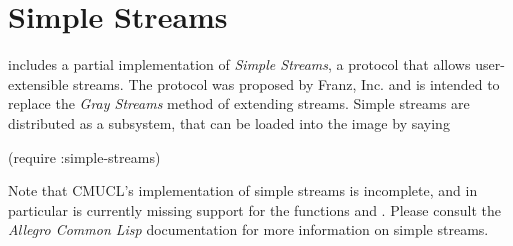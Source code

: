 \section{Simple Streams}
\label{simple-streams}

\cmucl{} includes a partial implementation of \emph{Simple Streams}, a
protocol that allows user-extensible streams. The protocol was
proposed by Franz, Inc. and is intended to replace the \emph{Gray
Streams} method of extending streams. Simple streams are distributed
as a \cmucl{} subsystem, that can be loaded into the image by saying

\begin{lisp}
   (require :simple-streams)
\end{lisp}

Note that CMUCL's implementation of simple streams is incomplete, and
in particular is currently missing support for the functions
 and . Please consult the
\textit{Allegro Common Lisp} documentation for more information on
simple streams.

